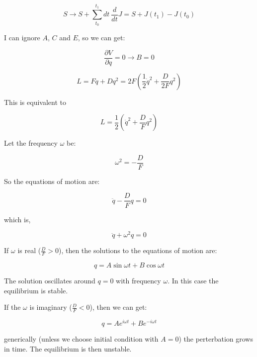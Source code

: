 \begin{equation}
    S \rightarrow S + \sum_{t_0}^{t_1} dt \ \frac{d}{dt} J = S + J\left(t_1\right) - J\left(t_0\right)
\end{equation}

I can ignore $A$, $C$ and $E$, so we can get:

\begin{equation}
    \frac{\partial V}{\partial q} = 0 \rightarrow B = 0
\end{equation}

\begin{equation}
    L = F \dot{q} + D q^2 = 2F \left(\frac{1}{2} \dot{q}^2 + \frac{D}{2F} q^2\right)
\end{equation}

This is equivalent to 

\begin{equation}
    L = \frac{1}{2} \left(\dot{q}^2 + \frac{D}{F} q^2\right)
\end{equation}

Let the frequency $\omega$ be:

\begin{equation}
    \omega^2 = - \frac{D}{F}
\end{equation}

So the equations of motion are: 

\begin{equation}
    \ddot{q} - \frac{D}{F} q = 0
\end{equation}

which is,

\begin{equation}
    \ddot{q} + \omega^2 q = 0
\end{equation}

If $\omega$ is real ($\frac{D}{F} > 0$), then the solutions to the equations of motion are:

\begin{equation}
    q = A \sin{\omega t} + B \cos{\omega t}
\end{equation}  

The solution oscillates around $q = 0$ with frequency $\omega$. In this case the equilibrium is stable.

If the $\omega$ is imaginary ($\frac{D}{F} < 0$), then we can get:

\begin{equation}
    q = A e^{i \omega t} + B e^{-i \omega t}
\end{equation}

generically (unless we choose initial condition with $A = 0$) the perterbation grows in time. The equilibrium is then unstable.